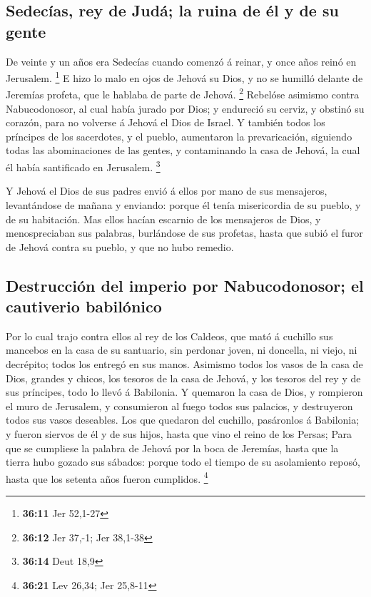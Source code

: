 \hypertarget{sedecuxedas-rey-de-juduxe1-la-ruina-de-uxe9l-y-de-su-gente}{%
\subsection{Sedecías, rey de Judá; la ruina de él y de su
gente}\label{sedecuxedas-rey-de-juduxe1-la-ruina-de-uxe9l-y-de-su-gente}}

 De veinte y un años era Sedecías cuando comenzó á reinar,
y once años reinó en Jerusalem. \footnote{\textbf{36:11} Jer 52,1-27}
 E hizo lo malo en ojos de Jehová su Dios, y no se humilló
delante de Jeremías profeta, que le hablaba de parte de Jehová.
\footnote{\textbf{36:12} Jer 37,-1; Jer 38,1-38}  Rebelóse
asimismo contra Nabucodonosor, al cual había jurado por Dios; y
endureció su cerviz, y obstinó su corazón, para no volverse á Jehová el
Dios de Israel.  Y también todos los príncipes de los
sacerdotes, y el pueblo, aumentaron la prevaricación, siguiendo todas
las abominaciones de las gentes, y contaminando la casa de Jehová, la
cual él había santificado en Jerusalem. \footnote{\textbf{36:14} Deut
  18,9}

 Y Jehová el Dios de sus padres envió á ellos por mano de
sus mensajeros, levantándose de mañana y enviando: porque él tenía
misericordia de su pueblo, y de su habitación.  Mas ellos
hacían escarnio de los mensajeros de Dios, y menospreciaban sus
palabras, burlándose de sus profetas, hasta que subió el furor de Jehová
contra su pueblo, y que no hubo remedio.

\hypertarget{destrucciuxf3n-del-imperio-por-nabucodonosor-el-cautiverio-babiluxf3nico}{%
\subsection{Destrucción del imperio por Nabucodonosor; el cautiverio
babilónico}\label{destrucciuxf3n-del-imperio-por-nabucodonosor-el-cautiverio-babiluxf3nico}}

 Por lo cual trajo contra ellos al rey de los Caldeos, que
mató á cuchillo sus mancebos en la casa de su santuario, sin perdonar
joven, ni doncella, ni viejo, ni decrépito; todos los entregó en sus
manos.  Asimismo todos los vasos de la casa de Dios,
grandes y chicos, los tesoros de la casa de Jehová, y los tesoros del
rey y de sus príncipes, todo lo llevó á Babilonia.  Y
quemaron la casa de Dios, y rompieron el muro de Jerusalem, y
consumieron al fuego todos sus palacios, y destruyeron todos sus vasos
deseables.  Los que quedaron del cuchillo, pasáronlos á
Babilonia; y fueron siervos de él y de sus hijos, hasta que vino el
reino de los Persas;  Para que se cumpliese la palabra de
Jehová por la boca de Jeremías, hasta que la tierra hubo gozado sus
sábados: porque todo el tiempo de su asolamiento reposó, hasta que los
setenta años fueron cumplidos. \footnote{\textbf{36:21} Lev 26,34; Jer
  25,8-11}

